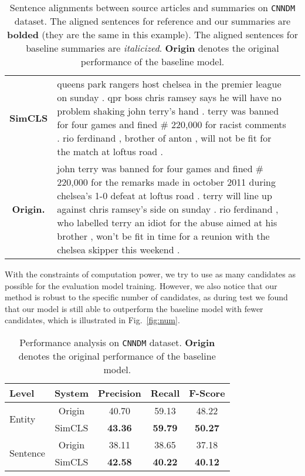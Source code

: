 \documentclass[11pt,a4paper]{article}
\begin{document}
\begin{table*}[t!]
\begin{tabular}{@{}c  p{} p{}}
 \\\cmidrule{1-2}
    \multicolumn{1}{c}{\cellcolor{gray!25}\bf SimCLS} 
     & \cellcolor{gray!25} queens park rangers host chelsea in the premier league on sunday . qpr boss chris ramsey says he will have no problem shaking john terry's hand . terry was banned for four games and fined \# 220,000 for racist comments . rio ferdinand , brother of anton , will not be fit for the match at loftus road . & 
 \\\cmidrule{1-2}
 \multicolumn{1}{c}{\bf Origin.} 
     &  john terry was banned for four games and fined \# 220,000 for the remarks made in october 2011 during chelsea's 1-0 defeat at loftus road . terry will line up against chris ramsey's side on sunday . rio ferdinand , who labelled terry an idiot for the abuse aimed at his brother , won't be fit in time for a reunion with the chelsea skipper this weekend . & 
 \\
  \bottomrule
\end{tabular}
\caption{Sentence alignments between source articles and summaries on \texttt{CNNDM} dataset. The aligned sentences for reference and our summaries are {\bf bolded} (they are the same in this example). The aligned sentences for baseline summaries are {\it italicized}. \textbf{Origin} denotes the original performance of the baseline model.}
\label{tab:example}
\end{table*}

With the constraints of computation power, we try to use as many candidates as possible for the evaluation model training. 
However, we also notice that our method is robust to the specific number of candidates, as during test we found that our model is still able to outperform the baseline model with fewer candidates, which is illustrated in Fig.~\ref{fig:num}.


\begin{table}[t!]
\small
\centering
\begin{tabular}{lcccc}
\toprule
\textbf{Level} & \textbf{System} & \textbf{Precision} & \textbf{Recall} & \textbf{F-Score}\\
\midrule
 \multirow{2}{*}{\parbox[]{0.08\textwidth}{Entity}} & Origin & 40.70 & 59.13 & 48.22 \\
 & SimCLS & \textbf{43.36} & \textbf{59.79} & \textbf{50.27}\\
\midrule
  \multirow{2}{*}{\parbox[]{0.08\textwidth}{Sentence}} & Origin & 38.11 & 38.65 & 37.18 \\
 & SimCLS & \textbf{42.58} & \textbf{40.22} & \textbf{40.12}\\
\bottomrule
\end{tabular}
\caption{\label{tab:entities} Performance analysis on \texttt{CNNDM} dataset. \textbf{Origin} denotes the original performance of the baseline model.}
\end{table}
\end{document}
